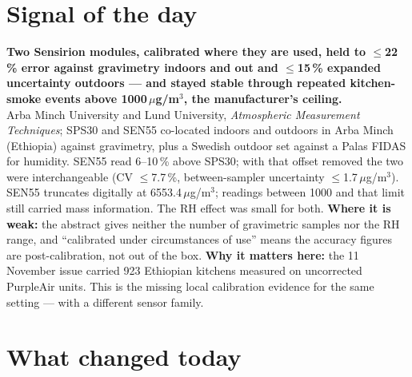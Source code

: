 \documentclass[10pt]{article}
\begin{document}
\vspace{6mm}

\section*{\sffamily\bfseries\color{Deep}Signal of the day}
\vspace{-1.5mm}{\color{Amber}\rule{\linewidth}{1.1pt}}\vspace{2.5mm}

\begin{keybox}
{\sffamily\bfseries\small\color{Deep}Two Sensirion modules, calibrated where they are used, held to $\le$22\,\% error against gravimetry indoors and out and $\le$15\,\% expanded uncertainty outdoors --- and stayed stable through repeated kitchen-smoke events above 1000\,$\mu$g/m$^3$, the manufacturer's ceiling.}\\[1.4mm]
\footnotesize
Arba Minch University and Lund University, \textit{Atmospheric Measurement Techniques}; SPS30 and SEN55 co-located indoors and outdoors in Arba Minch (Ethiopia) against gravimetry, plus a Swedish outdoor set against a Palas FIDAS for humidity. SEN55 read 6--10\,\% above SPS30; with that offset removed the two were interchangeable (CV $\le$7.7\,\%, between-sampler uncertainty $\le$1.7\,$\mu$g/m$^3$). SEN55 truncates digitally at 6553.4\,$\mu$g/m$^3$; readings between 1000 and that limit still carried mass information. The RH effect was small for both.
\textbf{Where it is weak:} the abstract gives neither the number of gravimetric samples nor the RH range, and ``calibrated under circumstances of use'' means the accuracy figures are post-calibration, not out of the box.
\textbf{Why it matters here:} the 11 November issue carried 923 Ethiopian kitchens measured on uncorrected PurpleAir units. This is the missing local calibration evidence for the same setting --- with a different sensor family.\par
\end{keybox}

\vspace{3mm}

\section*{\sffamily\bfseries\color{Deep}What changed today}
\vspace{-1.5mm}{\color{Amber}\rule{\linewidth}{1.1pt}}\vspace{2.5mm}
\end{document}
